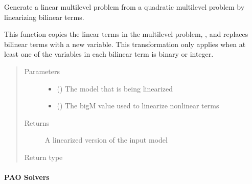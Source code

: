 \documentclass[letterpaper,10pt,english]{sphinxmanual}
\begin{document}

\begin{fulllineitems}
\label{\detokenize{reference/mpr:pao.mpr.convert_repn.linearize_bilinear_terms}}
Generate a linear multilevel problem from a quadratic multilevel
problem by linearizing bilinear terms.

This function copies the linear terms in the multilevel problem,
, and replaces bilinear terms with a new variable.  This
transformation only applies when at least one of the variables in
each bilinear term is binary or integer.
\begin{quote}\begin{description}
\item[{Parameters}] \leavevmode\begin{itemize}
\item {} 
 ({\hyperref[\detokenize{reference/mpr:pao.mpr.repn.QuadraticMultilevelProblem}]{}}) \textendash{} The model that is being linearized

\item {} 
 () \textendash{} The big\sphinxhyphen{}M value used to linearize nonlinear terms

\end{itemize}

\item[{Returns}] \leavevmode
A linearized version of the input model

\item[{Return type}] \leavevmode
{\hyperref[\detokenize{reference/mpr:pao.mpr.repn.LinearMultilevelProblem}]{}}

\end{description}\end{quote}

\end{fulllineitems}



\paragraph{PAO Solvers}
\label{\detokenize{reference/mpr:pao-solvers}}
\end{document}
